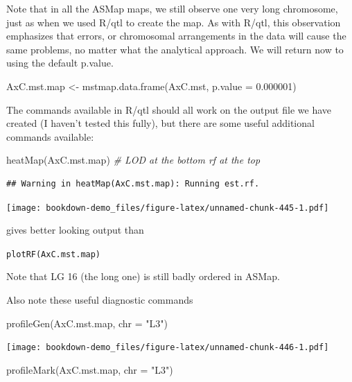 \documentclass[
]{book}
\newenvironment{Shaded}{\begin{snugshade}}{\end{snugshade}}
\newcommand{\AttributeTok}[1]{\textcolor[rgb]{0.77,0.63,0.00}{#1}}
\newcommand{\CommentTok}[1]{\textcolor[rgb]{0.56,0.35,0.01}{\textit{#1}}}
\newcommand{\FloatTok}[1]{\textcolor[rgb]{0.00,0.00,0.81}{#1}}
\newcommand{\FunctionTok}[1]{\textcolor[rgb]{0.00,0.00,0.00}{#1}}
\newcommand{\NormalTok}[1]{#1}
\newcommand{\OtherTok}[1]{\textcolor[rgb]{0.56,0.35,0.01}{#1}}
\newcommand{\StringTok}[1]{\textcolor[rgb]{0.31,0.60,0.02}{#1}}
\begin{document}
Note that in all the ASMap maps, we still observe one very long chromosome, just as when we used R/qtl to create the map. As with R/qtl, this observation emphasizes that errors, or chromosomal arrangements in the data will cause the same problems, no matter what the analytical approach. We will return now to using the default p.value.

\begin{Shaded}
\begin{Highlighting}[]
\NormalTok{AxC.mst.map }\OtherTok{\textless{}{-}} \FunctionTok{mstmap.data.frame}\NormalTok{(AxC.mst, }\AttributeTok{p.value =} \FloatTok{0.000001}\NormalTok{)}
\end{Highlighting}
\end{Shaded}

The commands available in R/qtl should all work on the output file we have created (I haven't tested this fully), but there are some useful additional commands available:

\begin{Shaded}
\begin{Highlighting}[]
\FunctionTok{heatMap}\NormalTok{(AxC.mst.map)  }\CommentTok{\# LOD at the bottom rf at the top }
\end{Highlighting}
\end{Shaded}

\begin{verbatim}
## Warning in heatMap(AxC.mst.map): Running est.rf.
\end{verbatim}

\texttt{[image: bookdown-demo\_files/figure-latex/unnamed-chunk-445-1.pdf]}

gives better looking output than

\texttt{plotRF(AxC.mst.map)}

Note that LG 16 (the long one) is still badly ordered in ASMap.

Also note these useful diagnostic commands

\begin{Shaded}
\begin{Highlighting}[]
\FunctionTok{profileGen}\NormalTok{(AxC.mst.map, }\AttributeTok{chr =} \StringTok{"L3"}\NormalTok{)}
\end{Highlighting}
\end{Shaded}

\texttt{[image: bookdown-demo\_files/figure-latex/unnamed-chunk-446-1.pdf]}

\begin{Shaded}
\begin{Highlighting}[]
\FunctionTok{profileMark}\NormalTok{(AxC.mst.map, }\AttributeTok{chr =} \StringTok{"L3"}\NormalTok{)}
\end{Highlighting}
\end{Shaded}
\end{document}
